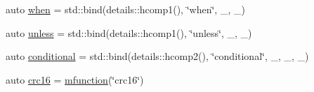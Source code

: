 \begin{DoxyCompactItemize}
\item 
auto \hyperlink{namespacepfq__lang_1_1anonymous__namespace_02default_8hpp_03_a10e1a2f363aa41a978622f322ac6241f}{when} = std\+::bind(details\+::hcomp1(), \char`\"{}when\char`\"{}, \+\_, \+\_)
\item 
auto \hyperlink{namespacepfq__lang_1_1anonymous__namespace_02default_8hpp_03_af01f3831a7b0294b6ffef87a09b481d7}{unless} = std\+::bind(details\+::hcomp1(), \char`\"{}unless\char`\"{}, \+\_, \+\_)
\item 
auto \hyperlink{namespacepfq__lang_1_1anonymous__namespace_02default_8hpp_03_a022d0075edf2fff575b93377aec0c228}{conditional} = std\+::bind(details\+::hcomp2(), \char`\"{}conditional\char`\"{}, \+\_, \+\_, \+\_)
\item 
auto \hyperlink{namespacepfq__lang_1_1anonymous__namespace_02default_8hpp_03_aaa12e1daf6bd2719a3b8592e673acf84}{crc16} = \hyperlink{namespacepfq__lang_a47d60e7fc6df739692308276b8f6d4e4}{mfunction}(\char`\"{}crc16\char`\"{})
\end{DoxyCompactItemize}


